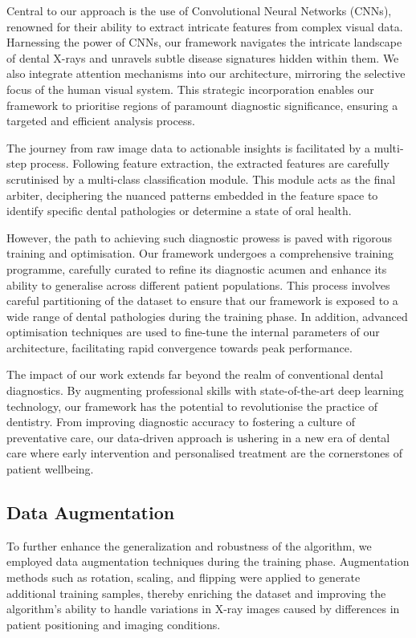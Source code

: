 \documentclass[journal,twoside,web]{ieeecolor}
\begin{document}
Central to our approach is the use of Convolutional Neural Networks (CNNs), renowned for their ability to extract intricate features from complex visual data. Harnessing the power of CNNs, our framework navigates the intricate landscape of dental X-rays and unravels subtle disease signatures hidden within them. We also integrate attention mechanisms into our architecture, mirroring the selective focus of the human visual system. This strategic incorporation enables our framework to prioritise regions of paramount diagnostic significance, ensuring a targeted and efficient analysis process.

The journey from raw image data to actionable insights is facilitated by a multi-step process. Following feature extraction, the extracted features are carefully scrutinised by a multi-class classification module. This module acts as the final arbiter, deciphering the nuanced patterns embedded in the feature space to identify specific dental pathologies or determine a state of oral health.


However, the path to achieving such diagnostic prowess is paved with rigorous training and optimisation. Our framework undergoes a comprehensive training programme, carefully curated to refine its diagnostic acumen and enhance its ability to generalise across different patient populations. This process involves careful partitioning of the dataset to ensure that our framework is exposed to a wide range of dental pathologies during the training phase. In addition, advanced optimisation techniques are used to fine-tune the internal parameters of our architecture, facilitating rapid convergence towards peak performance.

The impact of our work extends far beyond the realm of conventional dental diagnostics. By augmenting professional skills with state-of-the-art deep learning technology, our framework has the potential to revolutionise the practice of dentistry. From improving diagnostic accuracy to fostering a culture of preventative care, our data-driven approach is ushering in a new era of dental care where early intervention and personalised treatment are the cornerstones of patient wellbeing.


\subsection{Data Augmentation}

To further enhance the generalization and robustness of the algorithm, we employed data augmentation techniques during the training phase. Augmentation methods such as rotation, scaling, and flipping were applied to generate additional training samples, thereby enriching the dataset and improving the algorithm's ability to handle variations in X-ray images caused by differences in patient positioning and imaging conditions.
\end{document}
